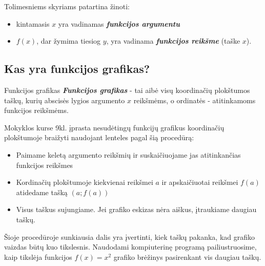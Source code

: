 \documentclass{article}
\begin{document}
Tolimesniems skyriams patartina žinoti:
\begin{itemize}
\item kintamasis $x$ yra vadinamas \textbf{\textit{funkcijos argumentu}}
\item $f(x)$, dar žymima tiesiog $y$, yra vadinama \textbf{\textit{funkcijos reikšme}} (taške $x$).
\end{itemize}
\subsection*{Kas yra funkcijos grafikas?}
\begin{mybox}{Funkcijos grafikas}
\textbf{\textit{Funkcijos grafikas}} - tai aibė visų koordinačių plokštumos taškų, kurių abscisės lygios argumento $x$ reikšmėms, o ordinatės - atitinkamoms funkcijos reikšmėms. 
\end{mybox}
Mokyklos kurse 9kl. įprasta nesudėtingų funkcijų grafikus koordinačių plokštumoje braižyti naudojant lenteles pagal šią procedūrą:
\begin{itemize}
\item Paimame keletą argumento reikšmių ir suskaičiuojame jas atitinkančias funkcijos reikšmes
\item Kordinačių plokštumoje kiekvienai reikšmei $a$ ir apskaičiuotai reikšmei $f(a)$ atidedame tašką $(a; f(a))$
\item Visus taškus sujungiame. Jei grafiko eskizas nėra aiškus, įtraukiame daugiau taškų.
\end{itemize}

Šioje procedūroje sunkiausia dalis yra įvertinti, kiek taškų pakanka, kad grafiko vaizdas būtų kuo tikslesnis. Naudodami kompiuterinę programą pailiustruosime, kaip tikslėja funkcijos $f(x)=x^2$ grafiko brėžinys pasirenkant vis daugiau taškų. 
\end{document}
